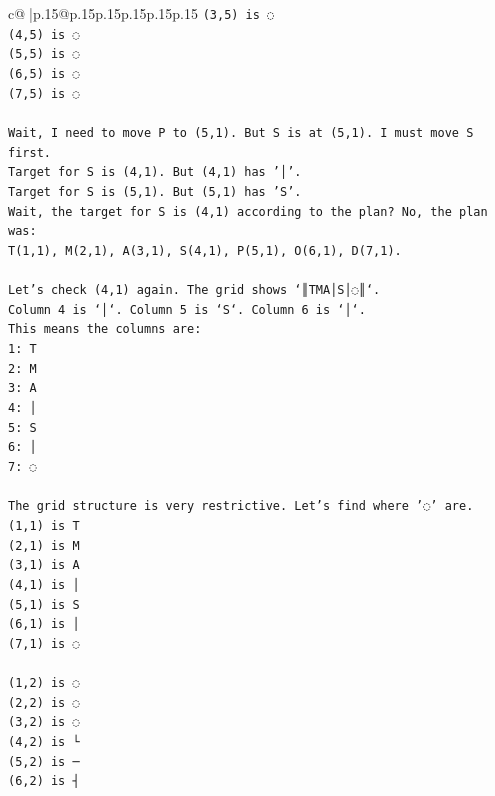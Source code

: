 \documentclass{article}
\begin{document}
{\begin{supertabular}{c@{$\;$}|p{.15\linewidth}@{}p{.15\linewidth}p{.15\linewidth}p{.15\linewidth}p{.15\linewidth}p{.15\linewidth}}
{{{\texttt{(3,5) is ◌} \\
\texttt{(4,5) is ◌} \\
\texttt{(5,5) is ◌} \\
\texttt{(6,5) is ◌} \\
\texttt{(7,5) is ◌} \\
\\ 
\texttt{Wait, I need to move P to (5,1). But S is at (5,1). I must move S first.} \\
\texttt{Target for S is (4,1). But (4,1) has '│'.} \\
\texttt{Target for S is (5,1). But (5,1) has 'S'.} \\
\texttt{Wait, the target for S is (4,1) according to the plan? No, the plan was:} \\
\texttt{T(1,1), M(2,1), A(3,1), S(4,1), P(5,1), O(6,1), D(7,1).} \\
\\ 
\texttt{Let's check (4,1) again. The grid shows `║TMA│S│◌║`.} \\
\texttt{Column 4 is `│`. Column 5 is `S`. Column 6 is `│`.} \\
\texttt{This means the columns are:} \\
\texttt{1: T} \\
\texttt{2: M} \\
\texttt{3: A} \\
\texttt{4: │} \\
\texttt{5: S} \\
\texttt{6: │} \\
\texttt{7: ◌} \\
\\ 
\texttt{The grid structure is very restrictive. Let's find where '◌' are.} \\
\texttt{(1,1) is T} \\
\texttt{(2,1) is M} \\
\texttt{(3,1) is A} \\
\texttt{(4,1) is │} \\
\texttt{(5,1) is S} \\
\texttt{(6,1) is │} \\
\texttt{(7,1) is ◌} \\
\\ 
\texttt{(1,2) is ◌} \\
\texttt{(2,2) is ◌} \\
\texttt{(3,2) is ◌} \\
\texttt{(4,2) is └} \\
\texttt{(5,2) is ─} \\
\texttt{(6,2) is ┤} \\
}}}
\end{supertabular}}
\end{document}
